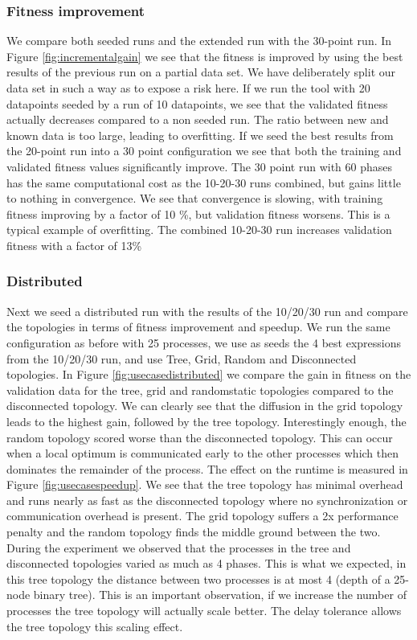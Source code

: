 \subsubsection{Fitness improvement}
We compare both seeded runs and the extended run with the 30-point run. In Figure \ref{fig:incrementalgain} we see that the fitness is improved by using the best results of the previous run on a partial data set. We have deliberately split our data set in such a way as to expose a risk here. If we run the tool with 20 datapoints seeded by a run of 10 datapoints, we see that the validated fitness actually decreases compared to a non seeded run. The ratio between new and known data is too large, leading to overfitting. If we seed the best results from the 20-point run into a 30 point configuration we see that both the training and validated fitness values significantly improve. The 30 point run with 60 phases has the same computational cost as the 10-20-30 runs combined, but gains little to nothing in convergence. We see that convergence is slowing, with training fitness improving by a factor of 10 \%, but validation fitness worsens. This is a typical example of overfitting. The combined 10-20-30 run increases validation fitness with a factor of 13\%

\subsubsection{Distributed}
Next we seed a distributed run with the results of the 10/20/30 run and compare the topologies in terms of fitness improvement and speedup. We run the same configuration as before with 25 processes, we use as seeds the 4 best expressions from the 10/20/30 run, and use Tree, Grid, Random and Disconnected topologies. In Figure \ref{fig:usecasedistributed} we compare the gain in fitness on the validation data for the tree, grid and randomstatic topologies compared to the disconnected topology. We can clearly see that the diffusion in the grid topology leads to the highest gain, followed by the tree topology. Interestingly enough, the random topology scored worse than the disconnected topology. This can occur when a local optimum is communicated early to the other processes which then dominates the remainder of the process. The effect on the runtime is measured in Figure \ref{fig:usecasespeedup}. We see that the tree topology has minimal overhead and runs nearly as fast as the disconnected topology where no synchronization or communication overhead is present. The grid topology suffers a 2x performance penalty and the random topology finds the middle ground between the two. During the experiment we observed that the processes in the tree and disconnected topologies varied as much as 4 phases. This is what we expected, in this tree topology the distance between two processes is at most 4 (depth of a 25-node binary tree). This is an important observation, if we increase the number of processes the tree topology will actually scale better. The delay tolerance allows the tree topology this scaling effect.

